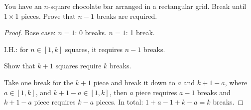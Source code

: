 \begin{prob}

You have an $n$-square chocolate bar arranged in a rectangular grid. Break until $1 \times 1$ pieces. Prove that $n - 1$ breaks are required.

\end{prob}

\begin{proof}

Base case: $n = 1$: 0 breaks. $n = 1$: 1 break.

I.H.: for $n \in [1, k]$ squares, it requires $n - 1$ breaks. 

Show that $k + 1$ squares require $k$ breaks. 

Take one break for the $k + 1$ piece and break it down to $a$ and $k + 1 - a$, where $a \in [1, k]$, and $k + 1 - a \in [1, k]$, then $a$ piece requires $a - 1$ breaks and $k + 1 - a$ piece requires $k - a$ pieces. In total: $1 + a - 1 + k - a = k$ breaks.

\end{proof}





